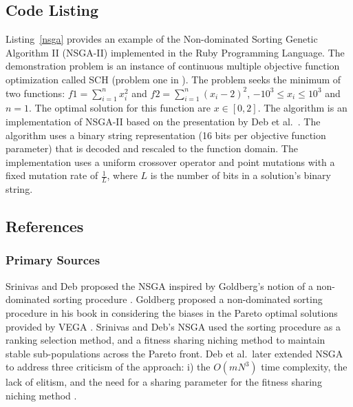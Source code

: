 \subsection{Code Listing}
Listing~\ref{nsga} provides an example of the Non-dominated Sorting Genetic Algorithm II (NSGA-II) implemented in the Ruby Programming Language.
The demonstration problem is an instance of continuous multiple objective function optimization called SCH (problem one in \cite{Deb2002}). The problem seeks the minimum of two functions: $f1=\sum_{i=1}^n x_{i}^2$ and $f2=\sum_{i=1}^n (x_{i}-2)^2$, $-10^3\leq x_i \leq 10^3$ and $n=1$. The optimal solution for this function are $x \in [0,2]$.
The algorithm is an implementation of NSGA-II based on the presentation by Deb et al.\ \cite{Deb2002}.
The algorithm uses a binary string representation (16 bits per objective function parameter) that is decoded and rescaled to the function domain. The implementation uses a uniform crossover operator and point mutations with a fixed mutation rate of $\frac{1}{L}$, where $L$ is the number of bits in a solution's binary string. 



\subsection{References}

% 
% 
\subsubsection{Primary Sources}
Srinivas and Deb proposed the NSGA inspired by Goldberg's notion of a non-dominated sorting procedure \cite{Srinivas1994}. Goldberg proposed a non-dominated sorting procedure in his book in considering the biases in the Pareto optimal solutions provided by VEGA \cite{Goldberg1989}. Srinivas and Deb's NSGA used the sorting procedure as a ranking selection method, and a fitness sharing niching method to maintain stable sub-populations across the Pareto front.
Deb et al.\ later extended NSGA to address three criticism of the approach: i) the $O(mN^3)$ time complexity, the lack of elitism, and the need for a sharing parameter for the fitness sharing niching method \cite{Deb2000, Deb2002}.

